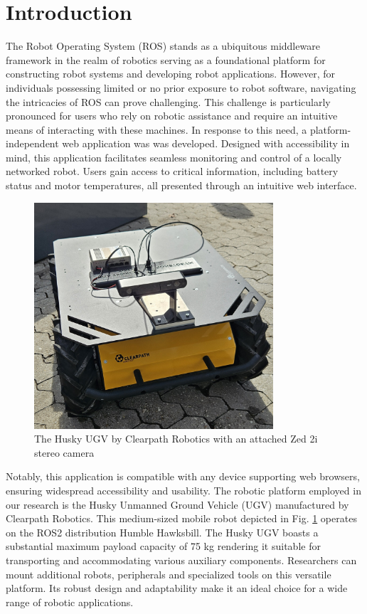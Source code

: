 \documentclass[conference]{IEEEtran}
\begin{document}
\section{Introduction}
The Robot Operating System (ROS) stands as a ubiquitous middleware framework in the realm of robotics serving as a foundational platform for constructing robot systems and developing robot applications. 
However, for individuals possessing limited or no prior exposure to robot software, navigating the intricacies of ROS can prove challenging. 
This challenge is particularly pronounced for users who rely on robotic assistance and require an intuitive means of interacting with these machines.
In response to this need, a platform-independent web application was was developed. 
Designed with accessibility in mind, this application facilitates seamless monitoring and control of a locally networked robot. Users gain access to critical information, including battery status and motor temperatures, all presented through an intuitive web interface. 
\begin{figure}[htp]
    \centerline{\includegraphics[width=8.9cm]{Pictures/huskyzed2.jpg}}
    \caption{The Husky UGV by Clearpath Robotics with an attached Zed 2i stereo camera}
    \label{fig:huskyClearpath}
\end{figure}
Notably, this application is compatible with any device supporting web browsers, ensuring widespread accessibility and usability.
The robotic platform employed in our research is the Husky Unmanned Ground Vehicle (UGV) manufactured by Clearpath Robotics. This medium-sized mobile robot depicted in Fig. \ref{fig:huskyClearpath} operates on the ROS2 distribution Humble Hawksbill.
The Husky UGV boasts a substantial maximum payload capacity of 75 kg rendering it suitable for transporting and accommodating various auxiliary components. Researchers can mount additional robots, peripherals and specialized tools on this versatile platform. Its robust design and adaptability make it an ideal choice for a wide range of robotic applications\cite{huskyClearpath}. 
\end{document}

